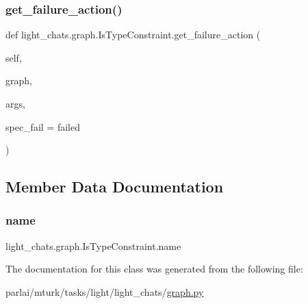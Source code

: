 \subsubsection{\texorpdfstring{get\+\_\+failure\+\_\+action()}{get\_failure\_action()}}
{\footnotesize\ttfamily def light\+\_\+chats.\+graph.\+Is\+Type\+Constraint.\+get\+\_\+failure\+\_\+action (\begin{DoxyParamCaption}\item[{}]{self,  }\item[{}]{graph,  }\item[{}]{args,  }\item[{}]{spec\+\_\+fail = {\ttfamily \textquotesingle{}failed\textquotesingle{}} }\end{DoxyParamCaption})}



\subsection{Member Data Documentation}
\mbox{\label{classlight__chats_1_1graph_1_1IsTypeConstraint_a1378fd0e57416b317a7754d3059a65ff}} 
\subsubsection{\texorpdfstring{name}{name}}
{\footnotesize\ttfamily light\+\_\+chats.\+graph.\+Is\+Type\+Constraint.\+name\hspace{0.3cm}{\ttfamily [static]}}



The documentation for this class was generated from the following file\+:\begin{DoxyCompactItemize}
\item 
parlai/mturk/tasks/light/light\+\_\+chats/\hyperlink{parlai_2mturk_2tasks_2light_2light__chats_2graph_8py}{graph.\+py}\end{DoxyCompactItemize}
